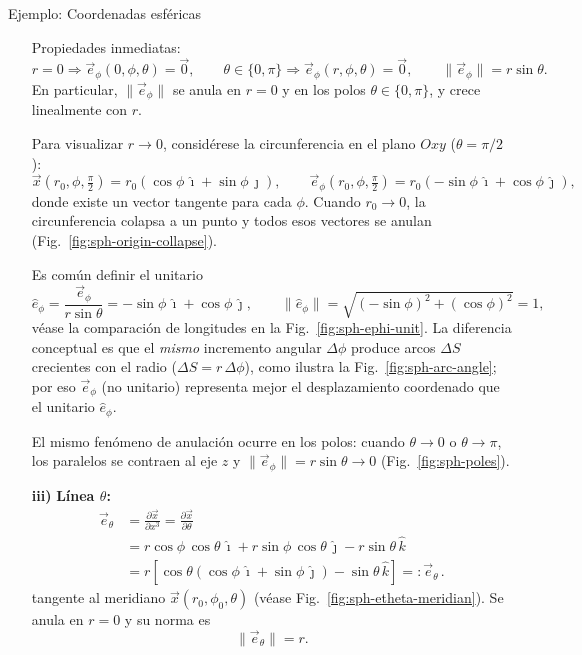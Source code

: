 \documentclass[../apunte_mecanica_clasica.tex]{subfiles}%
\begin{document}
\begin{apuntebloque}{Ejemplo: Coordenadas esféricas}
\begin{itemize}
\medskip
\noindent Propiedades inmediatas:
\begin{equation*}
r=0\Rightarrow \vec{e}_\phi(0,\phi,\theta)=\vec{0},\qquad
\theta\in\{0,\pi\}\Rightarrow \vec{e}_\phi(r,\phi,\theta)=\vec{0},\qquad
\|\vec{e}_\phi\|=r\sin\theta.
\end{equation*}
En particular, $\|\vec{e}_\phi\|$ se anula en $r=0$ y en los polos $\theta\in\{0,\pi\}$, y crece linealmente con $r$.

Para visualizar $r\to0$, considérese la circunferencia en el plano $Oxy$ ($\theta=\pi/2$):
\begin{equation*}
\vec{x}(r_0,\phi,\tfrac{\pi}{2})=r_0(\cos\phi\,\hat{\imath}+\sin\phi\,\hat{\jmath}),\qquad
\vec{e}_\phi(r_0,\phi,\tfrac{\pi}{2})=r_0(-\sin\phi\,\hat{\imath}+\cos\phi\,\hat{\jmath}),
\end{equation*}
donde existe un vector tangente para cada $\phi$. Cuando $r_0\to0$, la circunferencia colapsa a un punto y todos esos vectores se anulan (Fig.~\ref{fig:sph-origin-collapse}).

Es común definir el unitario
\begin{equation*}
\hat{e}_\phi=\frac{\vec{e}_\phi}{r\sin\theta}=-\sin\phi\,\hat{\imath}+\cos\phi\,\hat{\jmath},\qquad
\|\hat{e}_\phi\|=\sqrt{(-\sin\phi)^2+(\cos\phi)^2}=1,
\end{equation*}
véase la comparación de longitudes en la Fig.~\ref{fig:sph-ephi-unit}.
La diferencia conceptual es que el \emph{mismo} incremento angular $\Delta\phi$ produce arcos $\Delta S$ crecientes con el radio ($\Delta S=r\,\Delta\phi$), como ilustra la Fig.~\ref{fig:sph-arc-angle}; por eso $\vec{e}_\phi$ (no unitario) representa mejor el desplazamiento coordenado que el unitario $\hat{e}_\phi$.

El mismo fenómeno de anulación ocurre en los polos: cuando $\theta\to0$ o $\theta\to\pi$, los paralelos se contraen al eje $z$ y $\|\vec{e}_\phi\|=r\sin\theta\to0$ (Fig.~\ref{fig:sph-poles}).

\item[\textbf{iii)}] \textbf{Línea $\theta$:}
\begin{align*}
\vec{e}_\theta
&=\frac{\partial\vec{x}}{\partial x^3}
 =\frac{\partial\vec{x}}{\partial\theta} \\
&=r\cos\phi\,\cos\theta\,\hat{\imath}
 +r\sin\phi\,\cos\theta\,\hat{\jmath}
 -r\sin\theta\,\hat{k} \\
&=r\left[\cos\theta\left(\cos\phi\,\hat{\imath}+\sin\phi\,\hat{\jmath}\right)-\sin\theta\,\hat{k}\right]
=:\vec{e}_\theta\,.
\end{align*}
tangente al meridiano $\vec{x}(r_0,\phi_0,\theta)$ (véase Fig.~\ref{fig:sph-etheta-meridian}). Se anula en $r=0$ y su norma es
\begin{equation*}
\|\vec{e}_\theta\|=r.
\end{equation*}
\end{itemize}


\end{apuntebloque}
\end{document}
